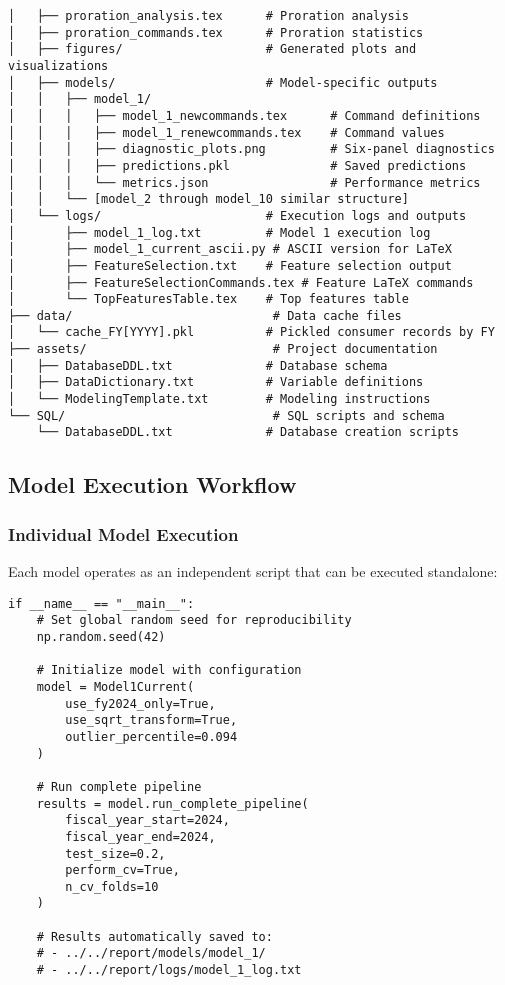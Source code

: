 \begin{verbatim}
│   ├── proration_analysis.tex      # Proration analysis
│   ├── proration_commands.tex      # Proration statistics
│   ├── figures/                    # Generated plots and visualizations
│   ├── models/                     # Model-specific outputs
│   │   ├── model_1/
│   │   │   ├── model_1_newcommands.tex      # Command definitions
│   │   │   ├── model_1_renewcommands.tex    # Command values
│   │   │   ├── diagnostic_plots.png         # Six-panel diagnostics
│   │   │   ├── predictions.pkl              # Saved predictions
│   │   │   └── metrics.json                 # Performance metrics
│   │   └── [model_2 through model_10 similar structure]
│   └── logs/                       # Execution logs and outputs
│       ├── model_1_log.txt         # Model 1 execution log
│       ├── model_1_current_ascii.py # ASCII version for LaTeX
│       ├── FeatureSelection.txt    # Feature selection output
│       ├── FeatureSelectionCommands.tex # Feature LaTeX commands
│       └── TopFeaturesTable.tex    # Top features table
├── data/                            # Data cache files
│   └── cache_FY[YYYY].pkl          # Pickled consumer records by FY
├── assets/                          # Project documentation
│   ├── DatabaseDDL.txt             # Database schema
│   ├── DataDictionary.txt          # Variable definitions
│   └── ModelingTemplate.txt        # Modeling instructions
└── SQL/                             # SQL scripts and schema
    └── DatabaseDDL.txt             # Database creation scripts
\end{verbatim}

\subsection{Model Execution Workflow}

\subsubsection{Individual Model Execution}

Each model operates as an independent script that can be executed standalone:

\begin{verbatim}
if __name__ == "__main__":
    # Set global random seed for reproducibility
    np.random.seed(42)
    
    # Initialize model with configuration
    model = Model1Current(
        use_fy2024_only=True,
        use_sqrt_transform=True,
        outlier_percentile=0.094
    )
    
    # Run complete pipeline
    results = model.run_complete_pipeline(
        fiscal_year_start=2024,
        fiscal_year_end=2024,
        test_size=0.2,
        perform_cv=True,
        n_cv_folds=10
    )
    
    # Results automatically saved to:
    # - ../../report/models/model_1/
    # - ../../report/logs/model_1_log.txt
\end{verbatim}

